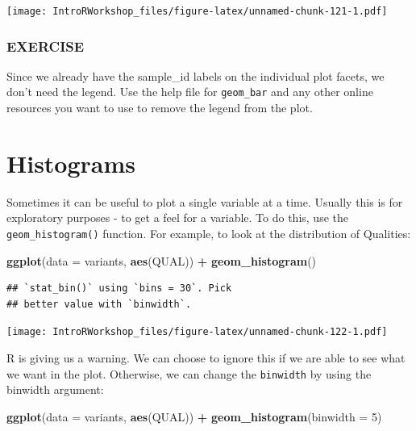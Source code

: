 \documentclass[]{book}
\newenvironment{Shaded}{\begin{snugshade}}{\end{snugshade}}
\newcommand{\DataTypeTok}[1]{\textcolor[rgb]{0.13,0.29,0.53}{#1}}
\newcommand{\DecValTok}[1]{\textcolor[rgb]{0.00,0.00,0.81}{#1}}
\newcommand{\KeywordTok}[1]{\textcolor[rgb]{0.13,0.29,0.53}{\textbf{#1}}}
\newcommand{\NormalTok}[1]{#1}
\newcommand{\OperatorTok}[1]{\textcolor[rgb]{0.81,0.36,0.00}{\textbf{#1}}}
\newcommand{\StringTok}[1]{\textcolor[rgb]{0.31,0.60,0.02}{#1}}
\begin{document}
\texttt{[image: IntroRWorkshop\_files/figure-latex/unnamed-chunk-121-1.pdf]}

\hypertarget{exercise-26}{%
\subsubsection*{EXERCISE}\label{exercise-26}}

Since we already have the sample\_id labels on the individual plot facets, we don't need the legend. Use the help file for \texttt{geom\_bar} and any other online resources you want to use to remove the legend from the plot.

\hypertarget{histograms}{%
\section{Histograms}\label{histograms}}

Sometimes it can be useful to plot a single variable at a time. Usually this is for exploratory purposes - to get a feel for a variable. To do this, use the \texttt{geom\_histogram()} function. For example, to look at the distribution of Qualities:

\begin{Shaded}
\begin{Highlighting}[]
\KeywordTok{ggplot}\NormalTok{(}\DataTypeTok{data =}\NormalTok{ variants, }\KeywordTok{aes}\NormalTok{(QUAL)) }\OperatorTok{+}
\StringTok{  }\KeywordTok{geom_histogram}\NormalTok{()}
\end{Highlighting}
\end{Shaded}

\begin{verbatim}
## `stat_bin()` using `bins = 30`. Pick
## better value with `binwidth`.
\end{verbatim}

\texttt{[image: IntroRWorkshop\_files/figure-latex/unnamed-chunk-122-1.pdf]}

R is giving us a warning. We can choose to ignore this if we are able to see what we want in the plot. Otherwise, we can change the \texttt{binwidth} by using the binwidth argument:

\begin{Shaded}
\begin{Highlighting}[]
\KeywordTok{ggplot}\NormalTok{(}\DataTypeTok{data =}\NormalTok{ variants, }\KeywordTok{aes}\NormalTok{(QUAL)) }\OperatorTok{+}
\StringTok{  }\KeywordTok{geom_histogram}\NormalTok{(}\DataTypeTok{binwidth =} \DecValTok{5}\NormalTok{)}
\end{Highlighting}
\end{Shaded}
\end{document}
